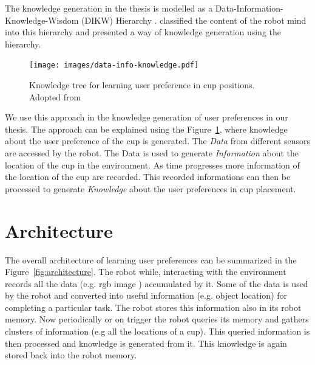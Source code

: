 The knowledge generation in the thesis is modelled as a Data-Information-Knowledge-Wisdom (DIKW) Hierarchy\citep{rowley2007wisdom} \citep{ackoff1989data}. \cite{niemueller2012generic} classified the content of the robot mind into this hierarchy and presented a way of knowledge generation using the hierarchy. 
\begin{figure}[htp]
\centering
\texttt{[image: images/data-info-knowledge.pdf]}
\caption{Knowledge tree for learning user preference in cup positions. Adopted from \citep{niemueller2012generic}}
\label{fig:dikw}
\end{figure}
We use this approach in the knowledge generation of user preferences in our thesis. The approach can be explained using the Figure~\ref{fig:dikw}, where knowledge about the user preference of the cup is generated. The \emph{Data} from different sensors are accessed by the robot. The Data is used to generate \emph{Information} about the location of the cup in the environment. As time progresses more information of the location of the cup are recorded. This recorded informations can then be processed to generate \emph{Knowledge} about the user preferences in cup placement.



\section{Architecture}
\label{cha:}
The overall architecture of learning user preferences can be summarized in the Figure~\ref{fig:architecture}. The robot while, interacting with the environment records all the data (e.g. rgb image ) accumulated by it. Some of the data is used by the robot and converted into useful information (e.g. object location) for completing a particular task. The robot stores this information also in its robot memory. Now periodically or on trigger the robot queries its memory and gathers clusters of information (e.g all the locations of a cup). This queried information is then processed and knowledge is generated from it. This knowledge is again stored back into the robot memory.

